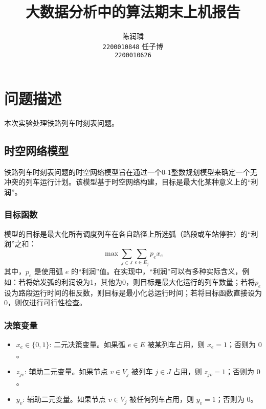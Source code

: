 \documentclass{article}
\title{大数据分析中的算法期末上机报告}
\author{%
    \large 陈润璘 \\
    \large \texttt{2200010848}
    \And
    \large 任子博 \\
    \large \texttt{2200010626}
}
\begin{document}
    \maketitle


    \section{问题描述}
    本次实验处理铁路列车时刻表问题。

    \subsection{时空网络模型}\label{subsec:spatial-temporal-network-model}

    铁路列车时刻表问题的时空网络模型旨在通过一个0-1整数规划模型来确定一个无冲突的列车运行计划。该模型基于时空网络构建，目标是最大化某种意义上的“利润”。

    \subsubsection{目标函数}
    模型的目标是最大化所有调度列车在各自路径上所选弧（路段或车站停驻）的“利润”之和：
    \begin{equation}
        \max \sum_{j \in J} \sum_{e \in E_j} p_e x_e\label{eq:obj}
    \end{equation}
    其中，$p_e$ 是使用弧 $e$
    的“利润”值。在实现中，“利润”可以有多种实际含义，例如：若将始发弧的利润设为1，其他为0，则目标是最大化运行的列车数量；若将$p_e$设为路段运行时间的相反数，则目标是最小化总运行时间；若将目标函数直接设为0，则仅进行可行性检查。

    \subsubsection{决策变量}
    \begin{itemize}
        \item $x_e \in \{0,1\}$: 二元决策变量。如果弧 $e \in E$ 被某列车占用，则 $x_e = 1$；否则为 $0$。
        \item $z_{jv}$: 辅助二元变量。如果节点 $v \in V_j$ 被列车 $j \in J$ 占用，则
        $z_{jv} = 1$；否则为 $0$。
        \item $y_v$: 辅助二元变量。如果节点 $v \in V_j$ 被任何列车占用，则 $y_v = 1$；否则为 $0$。
    \end{itemize}
\end{document}
